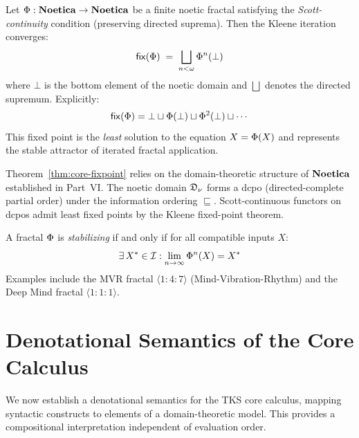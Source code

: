 \begin{theorem}
\label{thm:core-fixpoint}
Let $\Phi : \mathbf{Noetica} \to \mathbf{Noetica}$ be a finite noetic fractal satisfying the
\emph{Scott-continuity} condition (preserving directed suprema). Then the
Kleene iteration converges:
\[
    \mathsf{fix}(\Phi) \;=\; \bigsqcup_{n < \omega} \Phi^n(\bot)
\]
where $\bot$ is the bottom element of the noetic domain and $\bigsqcup$ denotes
the directed supremum. Explicitly:
\[
    \mathsf{fix}(\Phi) = \bot \sqcup \Phi(\bot) \sqcup \Phi^2(\bot) \sqcup \cdots
\]
This fixed point is the \emph{least} solution to the equation $X = \Phi(X)$ and
represents the stable attractor of iterated fractal application.
\end{theorem}

\begin{remark}
\label{rem:domain-theory}
Theorem~\ref{thm:core-fixpoint} relies on the domain-theoretic structure of $\mathbf{Noetica}$
established in Part~VI. The noetic domain $\mathfrak{D}_\nu$ forms a dcpo (directed-complete
partial order) under the information ordering $\sqsubseteq$. Scott-continuous functors
on dcpos admit least fixed points by the Kleene fixed-point theorem.
\end{remark}

\begin{corollary}
\label{cor:stabilizing-convergence}
A fractal $\Phi$ is \emph{stabilizing} if and only if for all compatible inputs $X$:
\[
    \exists\, X^* \in \mathcal{I} : \lim_{n \to \infty} \Phi^n(X) = X^*
\]
Examples include the MVR fractal $\langle 1 : 4 : 7 \rangle$ (Mind-Vibration-Rhythm)
and the Deep Mind fractal $\langle 1 : 1 : 1 \rangle$.
\end{corollary}

\section{Denotational Semantics of the Core Calculus}
\label{sec:core-denotational}

We now establish a denotational semantics for the TKS core calculus, mapping syntactic
constructs to elements of a domain-theoretic model. This provides a compositional
interpretation independent of evaluation order.

